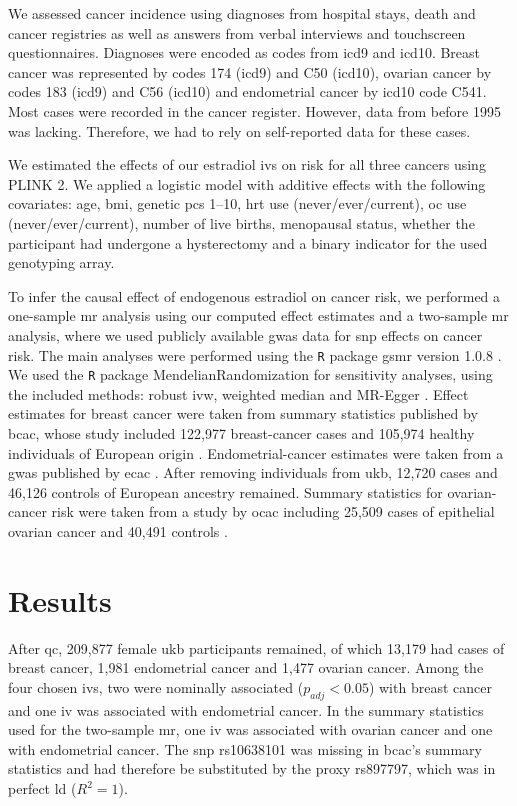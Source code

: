 \documentclass[draft]{scrbook}
\begin{document}
We assessed cancer incidence using diagnoses from hospital stays, death and cancer registries as well as answers from verbal interviews and touchscreen questionnaires.
Diagnoses were encoded as codes from \gls{icd9} and \gls{icd10}.
Breast cancer was represented by codes 174 (\gls{icd9}) and C50 (\gls{icd10}), ovarian cancer by codes 183 (\gls{icd9}) and C56 (\gls{icd10}) and endometrial cancer by \gls{icd10} code C541.
Most cases were recorded in the cancer register.
However, data from before 1995 was lacking.
Therefore, we had to rely on self-reported data for these cases.

We estimated the effects of our estradiol \glspl{iv} on risk for all three cancers using \textsf{PLINK 2}.
We applied a logistic model with additive effects with the following covariates: age, \gls{bmi}, genetic \glspl{pc} 1--10, \gls{hrt} use (never/ever/current), \gls{oc} use (never/ever/current), number of live births, menopausal status, whether the participant had undergone a hysterectomy and a binary indicator for the used genotyping array.

To infer the causal effect of endogenous estradiol on cancer risk, we performed a one-sample \gls{mr} analysis using our computed effect estimates and a two-sample \gls{mr} analysis, where we used publicly available \gls{gwas} data for \gls{snp} effects on cancer risk.
The main analyses were performed using the \texttt{R} package \textsf{gsmr} version 1.0.8 \cite{Zhu2018}.
We used the \texttt{R} package \textsf{MendelianRandomization} for sensitivity analyses, using the included methods: robust \gls{ivw}, weighted median and MR-Egger \cite{Olena2017}.
Effect estimates for breast cancer were taken from summary statistics published by \gls{bcac}, whose study included 122,977 breast-cancer cases and 105,974 healthy individuals of European origin \cite{Michailidou2017}.
Endometrial-cancer estimates were taken from a \gls{gwas} published by \gls{ecac} \cite{OMara2018}.
After removing individuals from \gls{ukb}, 12,720 cases and 46,126 controls of European ancestry remained.
Summary statistics for ovarian-cancer risk were taken from a study by \gls{ocac} including 25,509 cases of epithelial ovarian cancer and 40,491 controls \cite{Phelan2017}.

\section{Results}
After \gls{qc}, 209,877 female \gls{ukb} participants remained, of which 13,179 had cases of breast cancer, 1,981 endometrial cancer and 1,477 ovarian cancer.
Among the four chosen \glspl{iv}, two were nominally associated ($p_{adj} < 0.05$) with breast cancer and one \gls{iv} was associated with endometrial cancer.
In the summary statistics used for the two-sample \gls{mr}, one \gls{iv} was associated with ovarian cancer and one with endometrial cancer.
The \gls{snp} rs10638101 was missing in \gls{bcac}'s summary statistics and had therefore be substituted by the proxy rs897797, which was in perfect \gls{ld} ($R^2 = 1$).
\end{document}
